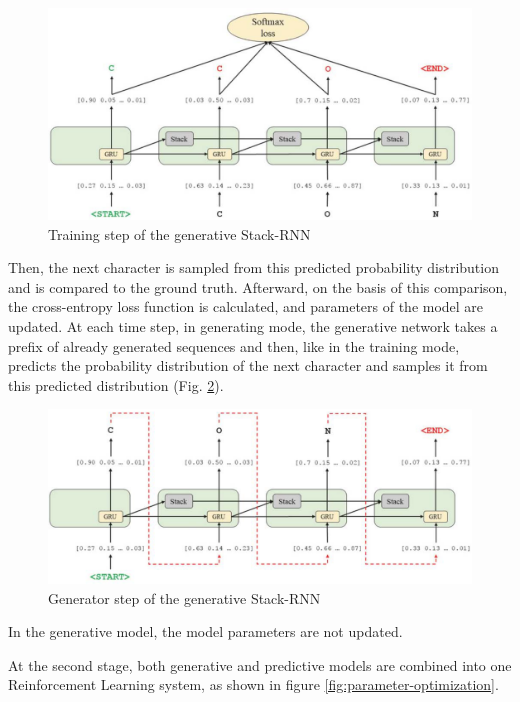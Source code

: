 \documentclass[a4paper]{article}
\begin{document}
\begin{figure}[htbp]
    \centering
        \includegraphics[width=\textwidth]{softmax-loss.png}
    \caption{Training step of the generative Stack-RNN}
    \label{fig:softmax-loss}
\end{figure}
	
Then, the next character is sampled from this predicted probability distribution and is compared to the ground truth. Afterward, on the basis of this comparison, the cross-entropy loss function is calculated, and parameters of the model are updated. 
At each time step, in generating mode, the generative network takes a prefix of already generated sequences and then, like in the training mode, predicts the probability distribution of the next character and samples it from this predicted distribution (Fig. \ref{fig:predicted-distribution}). 

\begin{figure}[htbp]
    \centering
        \includegraphics[width=\textwidth]{predicted-distribution.png}
    \caption{Generator step of the generative Stack-RNN}
    \label{fig:predicted-distribution}
\end{figure}
	
In the generative model, the model parameters are not updated. 


At the second stage, both generative and predictive models are combined into one Reinforcement Learning system, as shown in figure \ref{fig:parameter-optimization}. 
\end{document}
